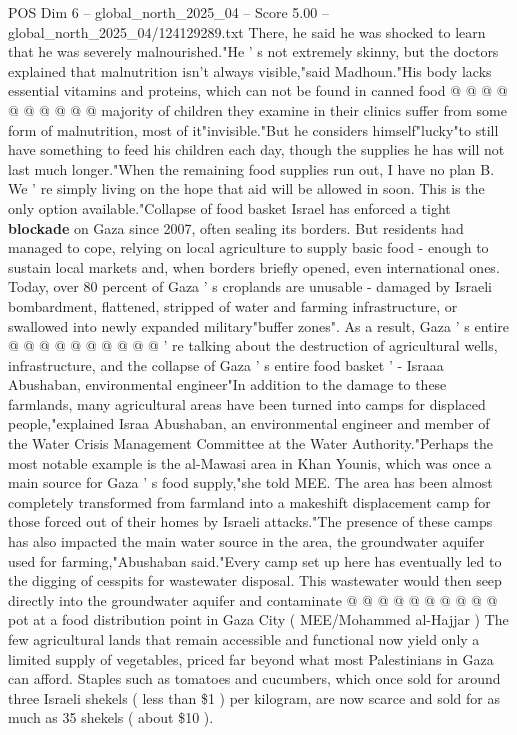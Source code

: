 \begin{textsample}{POS Dim 6 – global\_north\_2025\_04 – Score 5.00 – global\_north\_2025\_04/124129289.txt}
There, he said he was shocked to learn that he was severely malnourished."He ' s not extremely skinny, but the doctors explained that malnutrition isn't always visible,"said Madhoun."His body lacks essential vitamins and proteins, which can not be found in canned food @ @ @ @ @ @ @ @ @ @ majority of children they examine in their clinics suffer from some form of malnutrition, most of it"invisible."But he considers himself"lucky"to still have something to feed his children each day, though the supplies he has will not last much longer."When the remaining food supplies run out, I have no plan B.
We ' re simply living on the hope that aid will be allowed in soon.
This is the only option available."Collapse of food basket Israel has enforced a tight \textbf{blockade} on Gaza since 2007, often sealing its borders.
But residents had managed to cope, relying on local agriculture to supply basic food - enough to sustain local markets and, when borders briefly opened, even international ones.
Today, over 80 percent of Gaza ' s croplands are unusable - damaged by Israeli bombardment, flattened, stripped of water and farming infrastructure, or swallowed into newly expanded military"buffer zones".
As a result, Gaza ' s entire @ @ @ @ @ @ @ @ @ @ ' re talking about the destruction of agricultural wells, infrastructure, and the collapse of Gaza ' s entire food basket ' - Israaa Abushaban, environmental engineer"In addition to the damage to these farmlands, many agricultural areas have been turned into camps for displaced people,"explained Israa Abushaban, an environmental engineer and member of the Water Crisis Management Committee at the Water Authority."Perhaps the most notable example is the al-Mawasi area in Khan Younis, which was once a main source for Gaza ' s food supply,"she told MEE.
The area has been almost completely transformed from farmland into a makeshift displacement camp for those forced out of their homes by Israeli attacks."The presence of these camps has also impacted the main water source in the area, the groundwater aquifer used for farming,"Abushaban said."Every camp set up here has eventually led to the digging of cesspits for wastewater disposal.
This wastewater would then seep directly into the groundwater aquifer and contaminate @ @ @ @ @ @ @ @ @ @ pot at a food distribution point in Gaza City ( MEE/Mohammed al-Hajjar ) The few agricultural lands that remain accessible and functional now yield only a limited supply of vegetables, priced far beyond what most Palestinians in Gaza can afford.
Staples such as tomatoes and cucumbers, which once sold for around three Israeli shekels ( less than \$1 ) per kilogram, are now scarce and sold for as much as 35 shekels ( about \$10 ).

\end{textsample}
